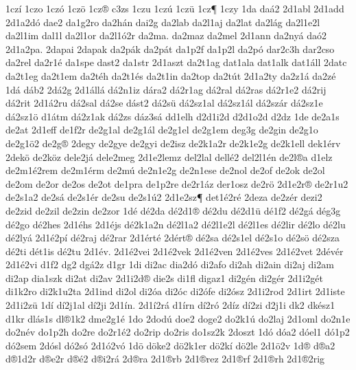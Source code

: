 {1cz^^ed
1czo
1cz^^f3
1cz^^f6
1cz^^ae
c3zs
1czu
1cz^^fa
1cz^^fc
1cz^^b6
1czy
1da
da^^e12
2d1abl
2d1add
2d1a2d^^f3
dae2
da1g2ro
da2h^^e1n
dai2g
da2lab
da2l1aj
da2lat
da2l^^e1g
da2l1e2l
da2l1im
dal1l
da2l1or
da2l1^^f32r
da2ma.
da2maz
da2mel
2d1ann
da2ny^^e1
da^^f32
2d1a2pa.
2dapai
2dapak
da2p^^e1k
da2p^^e1t
da1p2f
da1p2l
da2p^^f3
dar2c3h
dar2cso
da2rel
da2r1^^e9
da1spe
dast2
da1str
2d1aszt
da2t1ag
dat1ala
dat1alk
dat1^^e1ll
2datc
da2t1eg
da2t1em
da2t^^e9h
da2t1^^e9s
da2t1in
da2top
da2t^^fat
2d1a2ty
da2z1^^e1
da2z^^e9
1d^^e1
d^^e1b2
2d^^e12g
2d1^^e1ll^^e1
d^^e12n1iz
d^^e1ra2
d^^e12r1ag
d^^e12ral
d^^e12ras
d^^e12r1e2
d^^e12rij
d^^e12rit
2d1^^e12ru
d^^e12sal
d^^e12se
d^^e1st2
d^^e12s^^fc
d^^e12sz1al
d^^e12sz1^^e1l
d^^e12sz^^e1r
d^^e12sz1e
d^^e12sz1^^f6
d1^^e1tm
d^^e12z1ak
d^^e12zs
d^^e1z3s^^e1
dd1elh
d2d1i2d
d2d1o2d
d2dz
1de
de2a1s
de2at
2d1eff
de1f2r
de2g1al
de2g1^^e1l
de2g1el
de2g1em
deg3g
de2gin
de2g1o
de2g1^^f62
de2g^^ae
2degy
de2gye
de2gyi
de2isz
de2k1a2r
de2k1e2g
de2k1ell
dek1^^e9rv
2dek^^f6
de2k^^f6z
dele2j^^e1
dele2meg
2d1e2lemz
del2lal
dell^^e92
del2l1^^e9n
de2l^^aea
d1elz
de2m1^^e92rem
de2m1^^e9rm
de2m^^fa
de2n1e2g
de2n1ese
de2nol
de2of
de2ok
de2ol
de2om
de2or
de2os
de2ot
de1pra
de1p2re
de2r1^^e1z
der1osz
de2r^^f6
2d1e2r^^ae
de2r1u2
de2s1a2
de2s^^e1
de2s1^^e9r
de2su
de2s1^^fa2
2d1e2sz^^b6
det1^^e92r^^e9
2deza
de2z^^e9r
dezi2
de2zid
de2zil
de2zin
de2zor
1d^^e9
d^^e92da
d^^e92d1^^ae
d^^e92du
d^^e92d1^^fc
d^^e91f2
d^^e92g^^e1
d^^e9g3g
d^^e92go
d^^e92hes
2d1^^e9hs
2d1^^e9js
d^^e92k1a2n
d^^e92l1a2
d^^e92l1e2l
d^^e92l1es
d^^e92lir
d^^e92lo
d^^e92lu
d^^e92ly^^e1
2d1^^e92p^^ed
d^^e92raj
d^^e92rar
2d1^^e9rt^^e9
2d^^e9rt^^ae
d^^e92sa
d^^e92s1el
d^^e92s1o
d^^e92s^^f6
d^^e92sza
d^^e92ti
d^^e9t1is
d^^e92tu
2d1^^e9v.
2d1^^e92vei
2d1^^e92vek
2d1^^e92ven
2d1^^e92ves
2d1^^e92vet
2d^^e9v^^e9r
2d1^^e92vi
d1f2
dg2
dg^^e12z
d1gr
1di
di2ac
dia2d^^f3
di2afo
di2ah
di2ain
di2aj
di2am
di2ap
dia1szk
di2at
di2av
2d1i2d^^ae
die2s
di1fl
digaz1
di2g^^e9n
di2g^^e9r
2d1i2g^^e9t
di1k2ro
di2k1u2ta
2d1ind
di2ol
di2^^f3a
di2^^f3c
di2^^f3fe
di2^^f3sz
2d1i2rod
2d1irt
2d1iste
2d1i2z^^fc
1d^^ed
d^^ed2j1al
d^^ed2ji
2d1^^edn.
2d1^^ed2r^^e1
d1^^edrn
d^^ed2r^^f3
2d^^edz
d^^ed2zi
d2j1i
dk2
dk^^e9sz1
d1kr
dl^^e1s1s
dl^^ae1k2
dme2g1^^e9
1do
2dod^^fa
doe2
doge2
do2k1^^fa
do2laj
2d1oml
do2n1e
do2n^^e9v
do1p2h
do2re
do2r1^^e92
do2rip
do2ris
do1sz2k
2doszt
1d^^f3
d^^f3a2
d^^f3el1
d^^f31p2
d^^f32sem
2d^^f3sl
d^^f32s^^f3
2d1^^f32v^^f3
1d^^f6
d^^f6ke2
d^^f62k1er
d^^f62k^^ed
d^^f62le
2d1^^f62v
1d^^ae
d^^aea2
d^^ae1d2r
d^^aee2r
d^^ae^^e92
d^^aei2r^^e1
2d^^aera
2d1^^aerb
2d1^^aerez
2d1^^aerf
2d1^^aerh
2d1^^ae2rig
}

